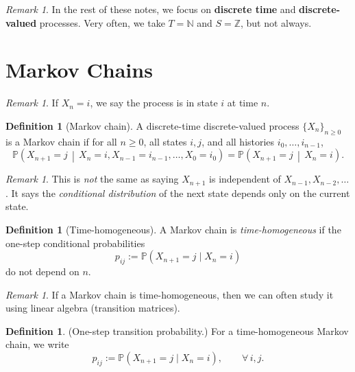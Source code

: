 \documentclass[11pt]{article}
\theoremstyle{plain}
\theoremstyle{definition}
\newtheorem{definition}[theorem]{Definition}
\theoremstyle{remark}
\newtheorem{remark}[theorem]{Remark}
\newcommand{\N}{\mathbb{N}}
\newcommand{\Z}{\mathbb{Z}}
\begin{document}
	\begin{remark}
		In the rest of these notes, we focus on \textbf{discrete time} and \textbf{discrete-valued} processes.
		Very often, we take \(T=\N\) and \(S=\Z\), but not always.
	\end{remark}
	
	\section{Markov Chains}
	
	\begin{remark}
		If \(X_n=i\), we say the process is in state \(i\) at time \(n\).
	\end{remark}
	
	\begin{definition}[Markov chain]
		A discrete-time discrete-valued process \(\{X_n\}_{n\ge 0}\) is a Markov chain if for all \(n\ge 0\),
		all states \(i,j\), and all histories \(i_0,\dots,i_{n-1}\),
		\[
		\mathbb{P}\!\left(X_{n+1}=j \,\middle|\, X_n=i, X_{n-1}=i_{n-1},\dots,X_0=i_0\right)
		=
		\mathbb{P}\!\left(X_{n+1}=j \,\middle|\, X_n=i\right).
		\]
	\end{definition}
	
	\begin{remark}
		This is \emph{not} the same as saying \(X_{n+1}\) is independent of \(X_{n-1},X_{n-2},\dots\).
		It says the \emph{conditional distribution} of the next state depends only on the current state.
	\end{remark}
	
	\begin{definition}[Time-homogeneous]
		A Markov chain is \emph{time-homogeneous} if the one-step conditional probabilities
		\[
		p_{ij}:=\mathbb{P}(X_{n+1}=j\mid X_n=i)
		\]
		do not depend on \(n\).
	\end{definition}
	
	\begin{remark}
		If a Markov chain is time-homogeneous, then we can often study it using linear algebra (transition matrices).
	\end{remark}
	
	\begin{definition}
		(One-step transition probability.)
		For a time-homogeneous Markov chain, we write
		\[
		p_{ij}:=\mathbb{P}(X_{n+1}=j\mid X_n=i),\qquad \forall\, i,j.
		\]
	\end{definition}
	
\end{document}
